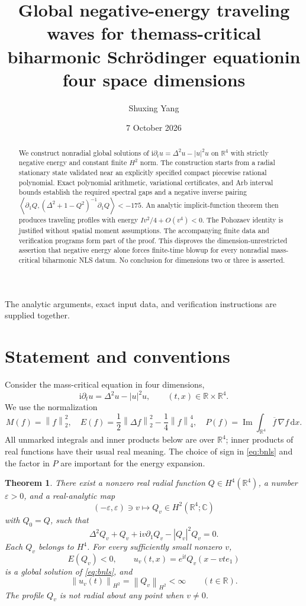 \documentclass[11pt,a4paper]{article}
\title{Global negative-energy traveling waves for the\newline mass-critical biharmonic Schr\"odinger equation\newline in four space dimensions}
\author{Shuxing Yang}
\date{7 October 2026}
\newtheorem{theorem}{Theorem}[section]
\theoremstyle{definition}\newtheorem{definition}[theorem]{Definition}
\theoremstyle{remark}\newtheorem{remark}[theorem]{Remark}
\newcommand{\R}{\mathbb R}
\newcommand{\C}{\mathbb C}
\newcommand{\ii}{\mathrm i}
\newcommand{\dd}{\,\mathrm d}
\newcommand{\norm}[1]{\left\|#1\right\|}
\newcommand{\ip}[2]{\left\langle #1,#2\right\rangle}
\newcommand{\Ima}{\operatorname{Im}}
\begin{document}
\maketitle
\begin{abstract}
We construct nonradial global solutions of
\(\ii\partial_tu=\Delta^2u-|u|^2u\) on \(\R^4\) with strictly negative energy and constant finite \(H^2\) norm. The construction starts from a radial stationary state validated near an explicitly specified compact piecewise rational polynomial. Exact polynomial arithmetic, variational certificates, and Arb interval bounds establish the required spectral gaps and a negative inverse pairing
\(\ip{\partial_1Q}{(\Delta^2+1-Q^2)^{-1}\partial_1Q}<-175\).
An analytic implicit-function theorem then produces traveling profiles with energy \(Iv^2/4+O(v^4)<0\). The Pohozaev identity is justified without spatial moment assumptions. The accompanying finite data and verification programs form part of the proof. This disproves the dimension-unrestricted assertion that negative energy alone forces finite-time blowup for every nonradial mass-critical biharmonic NLS datum. No conclusion for dimensions two or three is asserted.
\end{abstract}
The analytic arguments, exact input data, and verification instructions are supplied together.

\section{Statement and conventions}

Consider the mass-critical equation in four dimensions,
\begin{equation}\label{eq:bnls}
 \ii\partial_tu=\Delta^2u-|u|^2u,
 \qquad (t,x)\in\R\times\R^4.
\end{equation}
We use the normalization
\begin{equation}\label{eq:conserved}
 M(f)=\norm f_2^2,\quad
 E(f)=\frac12\norm{\Delta f}_2^2-\frac14\norm f_4^4,
 \quad P(f)=\Ima\int_{\R^4}\overline f\,\nabla f\dd x.
\end{equation}
All unmarked integrals and inner products below are over \(\R^4\); inner products of real functions have their usual real meaning. The choice of sign in \eqref{eq:bnls} and the factor in \(P\) are important for the energy expansion.

\begin{theorem}\label{thm:main}
There exist a nonzero real radial function \(Q\in H^4(\R^4)\), a number \(\varepsilon>0\), and a real-analytic map
\[
 (-\varepsilon,\varepsilon)\ni v\longmapsto Q_v\in H^2(\R^4;\C)
\]
with \(Q_0=Q\), such that
\begin{equation}\label{eq:profile}
 \Delta^2Q_v+Q_v+\ii v\partial_1Q_v-|Q_v|^2Q_v=0.
\end{equation}
Each \(Q_v\) belongs to \(H^4\). For every sufficiently small nonzero \(v\),
\[
 E(Q_v)<0,\qquad
 u_v(t,x)=e^{\ii t}Q_v(x-vte_1)
\]
is a global solution of \eqref{eq:bnls}, and
\[
 \norm{u_v(t)}_{H^2}=\norm{Q_v}_{H^2}<\infty\qquad(t\in\R).
\]
The profile \(Q_v\) is not radial about any point when \(v\ne0\).
\end{theorem}
\end{document}

